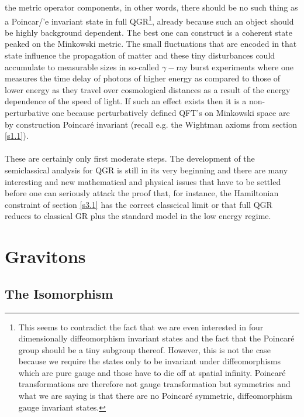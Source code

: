 \documentclass[12pt]{report}
\begin{document}
the metric operator components, in other words, there should be no such
thing as a Poincar/'e invariant state in full QGR\footnote{This seems 
to contradict the fact that we are even interested in four dimensionally
diffeomorphism invariant states and the fact that the Poincar\'e group 
should be a tiny subgroup thereof. However, this is not the case because 
we require the states only to be invariant under diffeomorphisms which 
are pure gauge and those have to die off at spatial infinity. Poincar\'e
transformations are therefore not gauge transformation but symmetries and 
what we are saying is that there are no Poincar\'e symmetric, 
diffeomorphism gauge invariant states.}, already because such an object 
should be highly background dependent. The best one can construct is
a coherent state peaked on the Minkowski metric. The small fluctuations 
that are encoded in that state influence the propagation of matter and 
these tiny disturbances could accumulate to measurable sizes in so-called
$\gamma-$ray burst experiments \cite{67} where one measures the time delay
of photons of higher energy as compared to those of lower energy as they
travel over cosmological distances as a result of the energy dependence of 
the speed of light. If such an effect exists then it is a non-perturbative 
one because perturbatively defined QFT's on Minkowski space are by 
construction Poincar\'e invariant (recall e.g. the Wightman axioms from 
section \ref{s1.1}).\\ 
\\
These are certainly only first moderate steps. The development of the 
semiclassical analysis for QGR is still in its very beginning 
and there are many interesting and new mathematical and physical issues 
that have to be 
settled before one can seriously attack the proof that, for instance, 
the Hamiltonian constraint of section \ref{s3.1} has the correct 
classcical limit or that full QGR reduces to classical GR plus the 
standard model in the low energy regime.   
 

\section{Gravitons}
\label{s3.6}

\subsection{The Isomorphism}
\label{s3.6.1}
\end{document}
